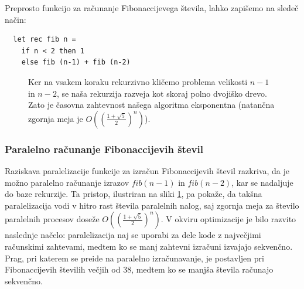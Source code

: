 \documentclass[mat1, tisk]{fmfdelo}
\begin{document}
Preprosto funkcijo za računanje Fibonaccijevega števila, lahko zapišemo na sledeč način:

\begin{lstlisting}
  let rec fib n =
    if n < 2 then 1
    else fib (n-1) + fib (n-2)
\end{lstlisting}

\begin{figure}[htb]
  \centering
  \caption{Ker na vsakem koraku rekurzivno kličemo problema velikosti $n-1$ in $n-2$, se naša rekurzija razveja
  kot skoraj polno dvojiško drevo. Zato je časovna zahtevnost našega algoritma eksponentna (natančna zgornja meja je 
  $O((\frac{1 + \sqrt{5}}{2})^n)$).}
  \label{fig:fib-graph}
\end{figure}

\subsubsection{Paralelno računanje Fibonaccijevih števil}

Raziskava paralelizacije funkcije za izračun Fibonaccijevih števil razkriva, da je možno paralelno računanje izrazov
$fib(n-1)$ in $fib(n-2)$, kar se nadaljuje do baze rekurzije. Ta pristop, ilustriran na sliki \ref{fig:fib-graph}, pa
pokaže, da takšna paralelizacija vodi v hitro rast števila paralelnih nalog, saj zgornja meja za število paralelnih
procesov doseže $O((\frac{1 + \sqrt{5}}{2})^n)$.
V okviru optimizacije je bilo razvito naslednje načelo: paralelizacija naj se uporabi za dele kode z največjimi
računskimi zahtevami, medtem ko se manj zahtevni izračuni izvajajo sekvenčno. Prag, pri katerem se preide na paralelno
izračunavanje, je postavljen pri Fibonaccijevih številih večjih od $38$, medtem ko se manjša števila računajo sekvenčno.
\end{document}
